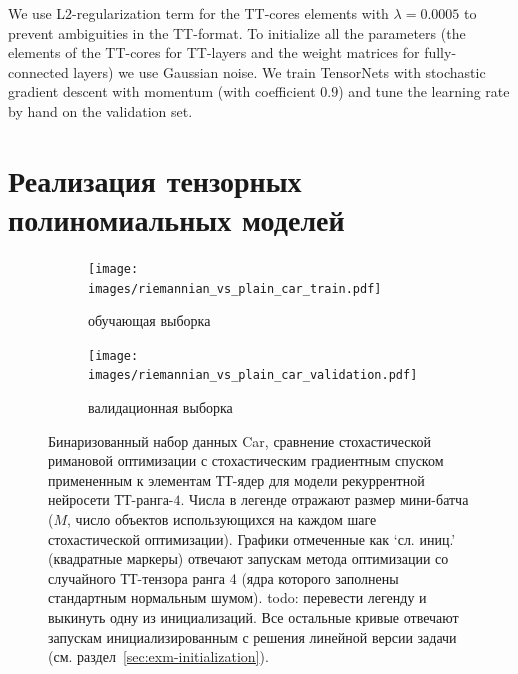 
We use L$2$-regularization term for the TT-cores elements with $\lambda = 0.0005$ to prevent ambiguities in the TT-format. To initialize all the parameters (the elements of the TT-cores for TT-layers and the weight matrices for fully-connected layers) we use Gaussian noise. We train TensorNets with stochastic gradient descent with momentum (with coefficient $0.9$) and tune the learning rate by hand on the validation set.


\section{Реализация тензорных полиномиальных моделей} \label{sec:exm-experiments}

\begin{figure}
    \centering
    \begin{subfigure}[b]{\textwidth}
        \texttt{[image: images/riemannian\_vs\_plain\_car\_train.pdf]}
        \caption{обучающая выборка}
    \end{subfigure}
    \begin{subfigure}[b]{\textwidth}
        \texttt{[image: images/riemannian\_vs\_plain\_car\_validation.pdf]}
        \caption{валидационная выборка}
    \end{subfigure}
    \caption{Бинаризованный набор данных Car, сравнение стохастической римановой оптимизации с стохастическим градиентным спуском примененным к элементам ТТ-ядер для модели рекуррентной нейросети ТТ-ранга-$4$. Числа в легенде отражают размер мини-батча ($M$, число объектов использующихся на каждом шаге стохастической оптимизации). Графики отмеченные как `сл. иниц.' (квадратные  маркеры) отвечают запускам метода оптимизации со случайного ТТ-тензора ранга 4 (ядра которого заполнены стандартным нормальным шумом). \alert{todo: перевести легенду и выкинуть одну из инициализаций}.
Все остальные кривые отвечают запускам инициализированным с решения линейной версии задачи (см. раздел~\ref{sec:exm-initialization}).}\label{fig:riemannian_vs_plain_car}
\end{figure}



